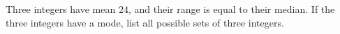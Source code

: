 Three integers have mean $24$, and their range is equal to their median. If the three integers have a mode, list all possible sets of three integers.
